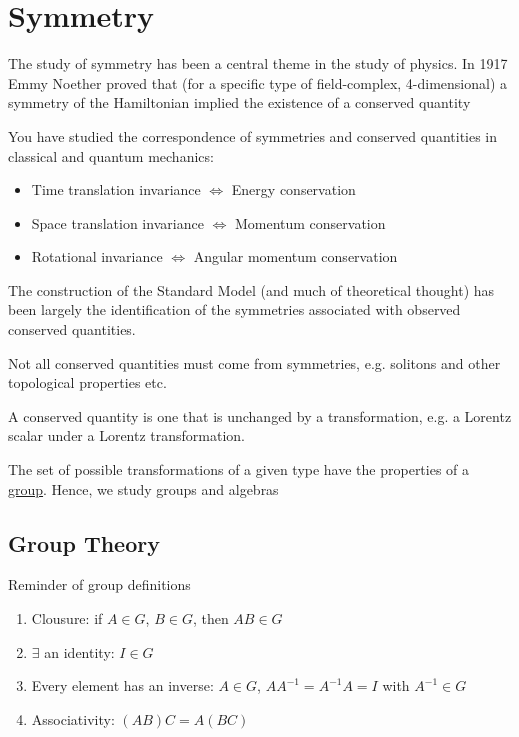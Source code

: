 \section{Symmetry}
The study of symmetry has been a central theme in the study of physics. In 1917 Emmy Noether proved that (for a specific type of field-complex, 4-dimensional) a symmetry of the Hamiltonian implied the existence of a conserved quantity

You have studied the correspondence of symmetries and conserved quantities in classical and quantum mechanics:
\begin{itemize}
\item Time translation invariance $\iff$ Energy conservation
\item Space translation invariance $\iff$ Momentum conservation
\item Rotational invariance $\iff$ Angular momentum conservation
\end{itemize}

The construction of the Standard Model (and much of theoretical thought) has been largely the identification of the symmetries associated with observed conserved quantities.

\begin{aside}
  Not all conserved quantities must come from symmetries, e.g. solitons and other topological properties etc.
\end{aside}

A conserved quantity is one that is unchanged by a transformation, e.g. a Lorentz scalar under a Lorentz transformation.

The set of possible transformations of a given type have the properties of a \underline{group}. Hence, we study groups and algebras

\subsection{Group Theory}
Reminder of group definitions
\begin{enumerate}
\item Clousure: if $A\in G$, $B\in G$, then $AB\in G$
\item $\exists$ an identity: $I\in G$
\item Every element has an inverse: $A\in G$, $AA^{-1}=A^{-1}A=I$ with $A^{-1}\in G$
\item Associativity: $(AB)C=A(BC)$
\end{enumerate}

